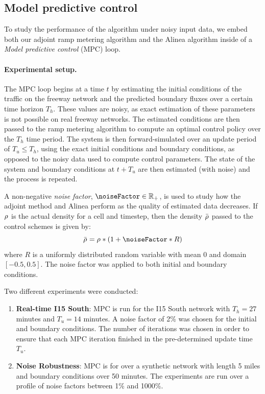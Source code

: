 																
								\subsection{Model predictive control\label{sub:Model-predictive-control}}
																
								To study the performance of the algorithm under noisy input data,
								we embed both our adjoint ramp metering algorithm and the Alinea algorithm
								inside of a \emph{Model predictive control }(MPC) loop.
																
																
								\paragraph{Experimental setup.}
																
								The MPC loop begins at a time $t$ by estimating the initial conditions
								of the traffic on the freeway network and the predicted boundary fluxes
								over a certain time horizon $T_{h}$. These values are noisy, as exact
								estimation of these parameters is not possible on real freeway networks.
								The estimated conditions are then passed to the ramp metering algorithm
								to compute an optimal control policy over the $T_{h}$ time period.
								The system is then forward-simulated over an update period of $T_{u}\le T_{h}$,
								using the exact initial conditions and boundary conditions, as opposed
								to the noisy data used to compute control parameters. The state of
								the system and boundary conditions at $t+T_{u}$ are then estimated
								(with noise) and the process is repeated.
																
								A non-negative\emph{ noise factor}, $\noiseFactor \in \R_+$, is used to study how the adjoint
								method and Alinea perform as the quality of estimated data decreases. If $\rho_{}^{}$ is the actual density for a cell and timestep, then the density $\bar{\rho_{}^{}}$ passed to the control schemes is given by:
								\[
									\bar{\discrete{}{}}=\discrete{}{}*(1+\noiseFactor*R)
								\]
								where $R$ is a uniformly distributed random variable with mean $0$
								and domain $\left[-0.5,0.5\right]$. The noise factor was applied
								to both initial and boundary conditions.
																
								Two different experiments were conducted:
								\begin{enumerate}
									\item \textbf{Real-time I15 South}: MPC is run for the I15 South network
									with $T_{h}=27$ minutes and $T_{u}=14$ minutes. A noise factor of
									2\% was chosen for the initial and boundary conditions. The number
									of iterations was chosen in order to ensure that each MPC iteration
									finished in the pre-determined update time $T_{u}$.
									\item \textbf{Noise Robustness}: MPC is for over a synthetic network with
									length 5 miles and boundary conditions over 50 minutes. The experiments
									are run over a profile of noise factors between 1\% and 1000\%.
								\end{enumerate}
																

